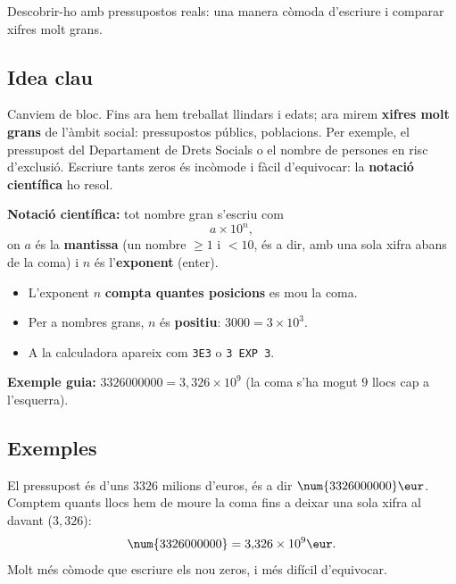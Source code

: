 %
{Descobrir-ho amb pressupostos reals: una manera còmoda d'escriure i comparar xifres molt grans.}

\subsection{Idea clau}

Canviem de bloc. Fins ara hem treballat llindars i edats; ara mirem
\textbf{xifres molt grans} de l'àmbit social: pressupostos públics, poblacions. Per
exemple, el pressupost del Departament de Drets Socials o el nombre de persones en
risc d'exclusió. Escriure tants zeros és incòmode i fàcil d'equivocar: la
\textbf{notació científica} ho resol.

\begin{idea}
\textbf{Notació científica:} tot nombre gran s'escriu com
\[
a\times 10^{n},
\]
on $a$ és la \textbf{mantissa} (un nombre $\ge 1$ i $<10$, és a dir, amb una sola
xifra abans de la coma) i $n$ és l'\textbf{exponent} (enter).
\begin{itemize}[leftmargin=1.4em, itemsep=2pt]
  \item L'exponent $n$ \textbf{compta quantes posicions} es mou la coma.
  \item Per a nombres grans, $n$ és \textbf{positiu}: $\num{3000}=3\times 10^{3}$.
  \item A la calculadora apareix com \texttt{3E3} o \texttt{3\,EXP\,3}.
\end{itemize}
\textbf{Exemple guia:} $\num{3326000000}=3,326\times 10^{9}$ (la coma s'ha mogut $9$
llocs cap a l'esquerra).
\end{idea}

\subsection{Exemples}

\begin{exemple}
El pressupost és d'uns $\num{3326}$ milions d'euros, és a dir
$\num{3326000000}\eur$. Comptem quants llocs hem de moure la coma fins a deixar una
sola xifra al davant ($3,326$):
\[
\num{3326000000} = 3{,}326\times 10^{9}\eur.
\]
Molt més còmode que escriure els nou zeros, i més difícil d'equivocar.
\end{exemple}

